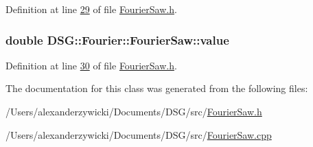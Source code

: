 Definition at line \hyperlink{_fourier_saw_8h_source_l00029}{29} of file \hyperlink{_fourier_saw_8h_source}{Fourier\+Saw.\+h}.

\hypertarget{class_d_s_g_1_1_fourier_1_1_fourier_saw_a97d69a0c03cfb66b1cf6e13fe7073c12}{
\subsubsection[{value}]{\setlength{\rightskip}{0pt plus 5cm}double D\+S\+G\+::\+Fourier\+::\+Fourier\+Saw\+::value\hspace{0.3cm}{\ttfamily [protected]}}}\label{class_d_s_g_1_1_fourier_1_1_fourier_saw_a97d69a0c03cfb66b1cf6e13fe7073c12}


Definition at line \hyperlink{_fourier_saw_8h_source_l00030}{30} of file \hyperlink{_fourier_saw_8h_source}{Fourier\+Saw.\+h}.



The documentation for this class was generated from the following files\+:\begin{DoxyCompactItemize}
\item 
/\+Users/alexanderzywicki/\+Documents/\+D\+S\+G/src/\hyperlink{_fourier_saw_8h}{Fourier\+Saw.\+h}\item 
/\+Users/alexanderzywicki/\+Documents/\+D\+S\+G/src/\hyperlink{_fourier_saw_8cpp}{Fourier\+Saw.\+cpp}\end{DoxyCompactItemize}
